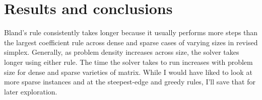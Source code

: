 \documentclass[9pt]{article}
\begin{document}
\section{Results and conclusions}
Bland's rule consistently takes longer
because it usually performs more steps than the largest
coefficient rule across dense and sparse cases of varying
sizes in revised simplex. Generally, as problem density
increases across size, the solver takes longer using
either rule. The time the solver takes to run
increases with problem size for dense and sparse varieties of matrix.
While I would have liked to look at more sparse instances
and at the steepest-edge and greedy rules,
I'll save that for later exploration.
\end{document}
